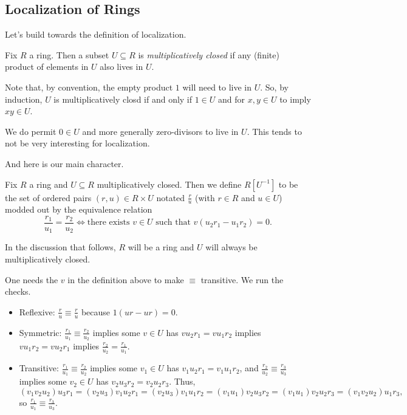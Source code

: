 \subsection{Localization of Rings}
Let's build towards the definition of localization.
\begin{definition}
	Fix $R$ a ring. Then a subset $U\subseteq R$ is \textit{multiplicatively closed} if any (finite) product of elements in $U$ also lives in $U$.
\end{definition}
Note that, by convention, the empty product $1$ will need to live in $U$. So, by induction, $U$ is multiplicatively closd if and only if $1\in U$ and for $x,y\in U$ to imply $xy\in U$.
\begin{remark}
	We do permit $0\in U$ and more generally zero-divisors to live in $U$. This tends to not be very interesting for localization.
\end{remark}
And here is our main character.
\begin{definition}
	Fix $R$ a ring and $U\subseteq R$ multiplicatively closed. Then we define $R\left[U^{-1}\right]$ to be the set of ordered pairs $(r,u)\in R\times U$ notated $\frac ru$ (with $r\in R$ and $u\in U$) modded out by the equivalence relation
	\[\frac{r_1}{u_1}=\frac{r_2}{u_2}\iff\text{there exists }v\in U\text{ such that }v(u_2r_1-u_1r_2)=0.\]
\end{definition}
In the discussion that follows, $R$ will be a ring and $U$ will always be multiplicatively closed.
\begin{remark}[Nir] \label{lem:localizeequiv}
	One needs the $v$ in the definition above to make $\equiv$ transitive. We run the checks.
	\begin{itemize}
		\item Reflexive: $\frac ru\equiv\frac ru$ because $1(ur-ur)=0$.
		\item Symmetric: $\frac{r_1}{u_1}\equiv\frac{r_2}{u_2}$ implies some $v\in U$ has $vu_2r_1=vu_1r_2$ implies $vu_1r_2=vu_2r_1$ implies $\frac{r_2}{u_2}=\frac{r_1}{u_1}$.
		\item Transitive: $\frac{r_1}{u_1}\equiv\frac{r_2}{u_2}$ implies some $v_1\in U$ has $v_1u_2r_1=v_1u_1r_2$, and $\frac{r_2}{u_2}\equiv\frac{r_3}{u_3}$ implies some $v_2\in U$ has $v_2u_3r_2=v_2u_2r_3$. Thus,
		\[(v_1v_2u_2)u_3r_1=(v_2u_3)v_1u_2r_1=(v_2u_3)v_1u_1r_2=(v_1u_1)v_2u_3r_2=(v_1u_1)v_2u_2r_3=(v_1v_2u_2)u_1r_3,\]
		so $\frac{r_1}{u_1}\equiv\frac{r_3}{u_3}$.
	\end{itemize}
\end{remark}
